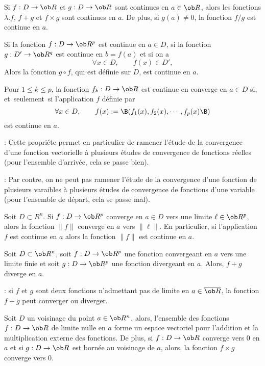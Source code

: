Si $f:D\to\ob R$ et $g:D\to\ob R$ sont continues en $a\in\ob R$, 
alors les fonctions $\lambda.f$, $f+g$ et $f\times g$ sont continues en $a$. \pn 
De plus, si $g(a)\neq 0$, la fonction $f/g$ est continue en $a$. 

Si la fonction $f:D\to\ob R^p$ est continue en $a\in D$, 
si la fonction $g:D'\to\ob R^q$ est continue en $b=f(a)$ et si on a 
$$
\forall x\in D, \qquad f(x)\in D',
$$
Alors la fonction $g\circ f$, qui est définie sur $D$, est continue en $a$. 


\Theoreme [$D\subset\ob R^n$] 
Pour $1\le k\le p$, la fonction $f_k:D\to\ob R$ est continue en converge en $a\in D$ 
si, et~seulement~si l'application $f$ définie par 
$$
\forall x\in D, \qquad f(x):=\B(f_1(x),f_2(x),\cdots,f_p(x)\B)
$$
est continue en $a$. 

\Remarque : Cette propriéte permet en particulier de ramener l'étude de la convergence d'une fonction vectorielle à plusieurs études de convergence de fonctions réelles (pour l'ensemble d'arrivée, cela se passe bien). 
\bigskip

\Remarque : Par contre, on ne peut pas ramener l'étude de la convergence d'une fonction de plusieurs varaibles à plusieurs études de convergence de fonctions d'une variable (pour l'ensemble de départ, cela se passe mal).
\bigskip


\Propriete []  Soit $D\subset R^n$. Si $f:D\to\ob R^p$ converge en $a\in D$ vers une limite $\ell\in\ob R^p$, alors la fonction $\|f\|$ converge en $a$ vers $\|\ell\|$. En particulier, si l'application $f$ est continue en $a$ alors la fonction $\|f\|$ est continue en $a$. 
\bigskip


\Propriete []  Soit $D\subset\ob R^n$, soit $f:D\to\ob R^p$ une fonction convergeant en $a$ vers une limite finie et soit $g:D\to\ob R^p$ une fonction divergeant en $a$. Alors, $f+g$ diverge en $a$. 
\bigskip

\Remarque : si $f$ et $g$ sont deux fonctions n'admettant pas de limite en $a\in\overline{\ob R}$, la fonction $f+g$ peut converger ou diverger. 
\bigskip

\Propriete []  Soit $D$ un voisinage du point $a\in\ob R^n$. alors, 
l'ensemble des fonctions $f:D\to\ob R$ de limite nulle en $a$ forme un espace vectoriel pour l'addition et la multiplication externe des fonctions. 
De plus, si $f:D\to\ob R$ converge vers $0$ en $a$ et si $g:D\to\ob R$ est bornée au voisinage de $a$, alors, la fonction $f\times g$ converge vers $0$. 

